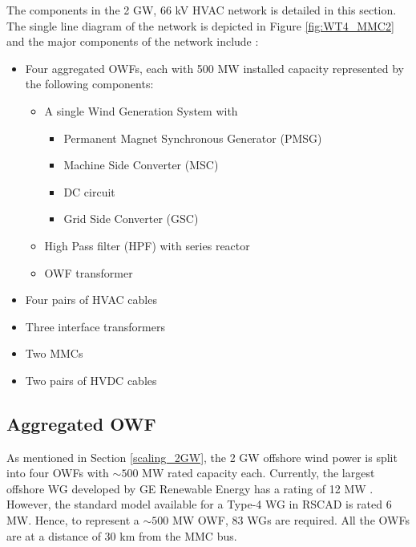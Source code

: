 The components in the 2 GW, 66 kV \gls{HVAC} network is detailed in this section. The single line diagram of the network is depicted in Figure \ref{fig:WT4_MMC2} and the major components of the network include :
\begin{itemize}
    \item Four aggregated \gls{OWF}s, each with 500 MW installed capacity represented by the following components:
    \begin{itemize}
        \item A single Wind Generation System with 
    \begin{itemize}
        \item Permanent Magnet Synchronous Generator (\gls{PMSG})
        \item Machine Side Converter (\gls{MSC})
        \item \gls{DC} circuit
        \item Grid Side Converter (\gls{GSC}) 
    \end{itemize}
        \item High Pass filter (\gls{HPF}) with series reactor
        \item \gls{OWF} transformer
    \end{itemize}
    \item Four pairs of \gls{HVAC} cables  
    \item Three interface transformers
    \item Two \gls{MMC}s
    \item Two pairs of \gls{HVDC} cables
\end{itemize}

\subsection{Aggregated OWF}\label{Aggregated_OWF_large_scale}
As mentioned in Section \ref{scaling_2GW}, the 2 GW offshore wind power is split into four \gls{OWF}s with $\sim{500}$ MW rated capacity each. Currently, the largest offshore \gls{WG} developed by GE Renewable Energy has a rating of 12 MW \cite{noauthor_worlds_2020}. However, the standard model available for a Type-4 \gls{WG} in RSCAD is rated 6 MW. Hence, to represent a $\sim{500}$ MW \gls{OWF}, 83 \gls{WG}s are required. All the \gls{OWF}s are at a distance of 30 km from the \gls{MMC} bus. 



